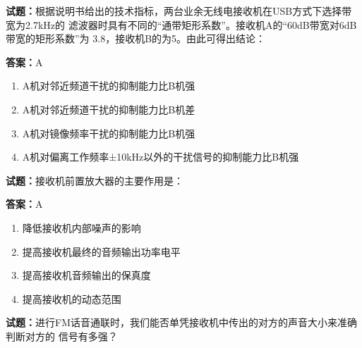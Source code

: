 \documentclass{ctexbook}
\begin{document}




\vspace{1em}

\textbf{试题：}根据说明书给出的技术指标，两台业余无线电接收机在USB方式下选择带宽为2.7kHz的
滤波器时具有不同的“通带矩形系数”。接收机A的“60dB带宽对6dB带宽的矩形系数”为
3.8，接收机B的为5。由此可得出结论： 

\textbf{答案：}A 

\begin{enumerate}[leftmargin=3em]
  \item A机对邻近频道干扰的抑制能力比B机强 


  \item A机对邻近频道干扰的抑制能力比B机差 

  \item A机对镜像频率干扰的抑制能力比B机强 

  \item A机对偏离工作频率±10kHz以外的干扰信号的抑制能力比B机强 

\end{enumerate}





\vspace{1em}

\textbf{试题：}接收机前置放大器的主要作用是： 

\textbf{答案：}A 

\begin{enumerate}[leftmargin=3em]
  \item 降低接收机内部噪声的影响 

  \item 提高接收机最终的音频输出功率电平 

  \item 提高接收机音频输出的保真度 

  \item 提高接收机的动态范围 

\end{enumerate}





\vspace{1em}

\textbf{试题：}进行FM话音通联时，我们能否单凭接收机中传出的对方的声音大小来准确判断对方的
信号有多强？ 
\end{document}
